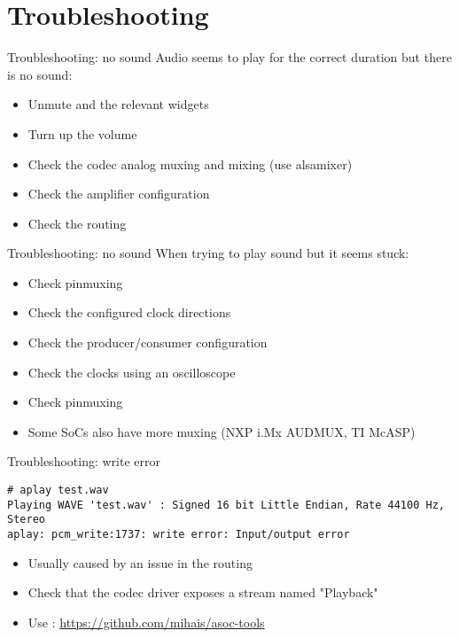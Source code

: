 \section{Troubleshooting}

\begin{frame}{Troubleshooting: no sound}
  Audio seems to play for the correct duration but there is no sound:
  \begin{itemize}
  \item Unmute  and the relevant widgets
  \item Turn up the volume
  \item Check the codec analog muxing and mixing (use alsamixer)
  \item Check the amplifier configuration
  \item Check the routing
  \end{itemize}
\end{frame}

\begin{frame}{Troubleshooting: no sound}
  When trying to play sound but it seems stuck:
  \begin{itemize}
  \item Check pinmuxing
  \item Check the configured clock directions
  \item Check the producer/consumer configuration
  \item Check the clocks using an oscilloscope
  \item Check pinmuxing
  \item Some SoCs also have more muxing (NXP i.Mx AUDMUX, TI McASP)
  \end{itemize}
\end{frame}

\begin{frame}[fragile]{Troubleshooting: write error}
  \begin{block}{}
    \fontsize{10}{10}\selectfont
    \begin{verbatim}
# aplay test.wav
Playing WAVE 'test.wav' : Signed 16 bit Little Endian, Rate 44100 Hz, Stereo
aplay: pcm_write:1737: write error: Input/output error
    \end{verbatim}
  \end{block}
  \begin{itemize}
  \item Usually caused by an issue in the routing
  \item Check that the codec driver exposes a stream named "Playback"
  \item Use :
    \url{https://github.com/mihais/asoc-tools}
  \end{itemize}
\end{frame}

